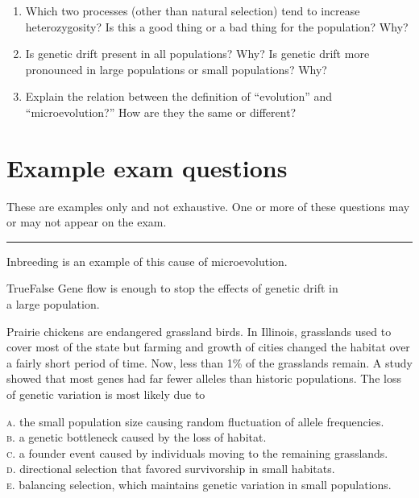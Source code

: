 \documentclass[letterpaper]{tufte-handout}
\begin{document}
\begin{enumerate}
	\item Which two processes (other than natural selection) tend to increase heterozygosity? Is this a good thing or a bad thing for the population? Why?

	\item Is genetic drift present in all populations? Why? Is genetic drift more pronounced in large populations or small populations?  Why?

	\item Explain the relation between the definition of ``evolution'' and “microevolution?” How are they the same or different? 
\end{enumerate}

\section*{Example exam questions}

These are examples only and not exhaustive. One or more of these questions may or may not appear on the exam.

\bigskip

\noindent \rule{1in}{0.4pt} Inbreeding is an example of this cause of microevolution.

\bigskip

\noindent True\hspace{1em}False\hspace{1em} Gene flow is enough to stop the effects of genetic drift in  \\
\noindent {}  a large population.

\bigskip

\noindent Prairie chickens are endangered grassland birds. In Illinois, grasslands used to cover most of the state but farming and growth of cities changed the habitat over a fairly short period of time. Now, less than 1\% of the grasslands remain. A study showed that most genes had far fewer alleles than historic populations. The loss of genetic variation is most likely due to

\smallskip

\noindent \textsc{a}. the small population size causing random fluctuation of allele frequencies.\\
\noindent \textsc{b}. a genetic bottleneck caused by the loss of habitat. \\
\noindent \textsc{c}. a founder event caused by individuals moving to the remaining grasslands. \\
\noindent \textsc{d}. directional selection that favored survivorship in small habitats. \\
\noindent \textsc{e}. balancing selection, which maintains genetic variation in small populations.
\end{document}
